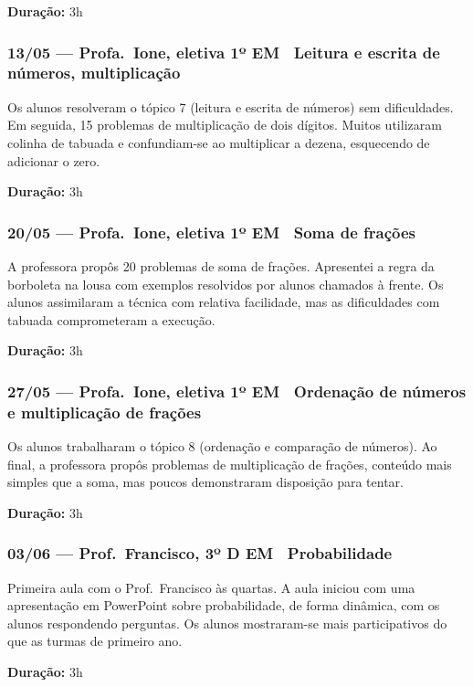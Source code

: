 \documentclass[11pt]{article}
\begin{document}
\textbf{Duração:} 3h

\subsubsection*{13/05 --- Profa.\ Ione, eletiva 1º EM \textbar\ Leitura e escrita de números, multiplicação}

Os alunos resolveram o tópico 7 (leitura e escrita de números) sem dificuldades. Em seguida, 15 problemas de multiplicação de dois dígitos. Muitos utilizaram colinha de tabuada e confundiam-se ao multiplicar a dezena, esquecendo de adicionar o zero.

\textbf{Duração:} 3h

\subsubsection*{20/05 --- Profa.\ Ione, eletiva 1º EM \textbar\ Soma de frações}

A professora propôs 20 problemas de soma de frações. Apresentei a regra da borboleta na lousa com exemplos resolvidos por alunos chamados à frente. Os alunos assimilaram a técnica com relativa facilidade, mas as dificuldades com tabuada comprometeram a execução.

\textbf{Duração:} 3h

\subsubsection*{27/05 --- Profa.\ Ione, eletiva 1º EM \textbar\ Ordenação de números e multiplicação de frações}

Os alunos trabalharam o tópico 8 (ordenação e comparação de números). Ao final, a professora propôs problemas de multiplicação de frações, conteúdo mais simples que a soma, mas poucos demonstraram disposição para tentar.

\textbf{Duração:} 3h

\subsubsection*{03/06 --- Prof.\ Francisco, 3º D EM \textbar\ Probabilidade}

Primeira aula com o Prof.\ Francisco às quartas. A aula iniciou com uma apresentação em PowerPoint sobre probabilidade, de forma dinâmica, com os alunos respondendo perguntas. Os alunos mostraram-se mais participativos do que as turmas de primeiro ano.

\textbf{Duração:} 3h
\end{document}
